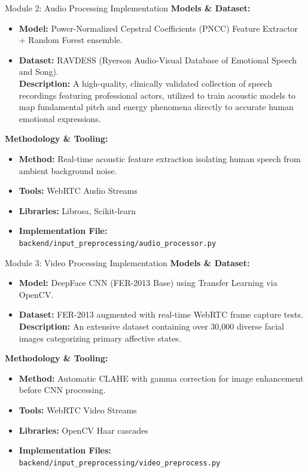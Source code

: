 \documentclass[11pt]{beamer}
\begin{document}
\begin{frame}{Module 2: Audio Processing Implementation}
    \justifying
    \textbf{Models \& Dataset:}
    \begin{itemize}
        \item \textbf{Model:} Power-Normalized Cepstral Coefficients (PNCC) Feature Extractor + Random Forest ensemble.
        \item \textbf{Dataset:} RAVDESS (Ryerson Audio-Visual Database of Emotional Speech and Song). \\ \textbf{Description:} A high-quality, clinically validated collection of speech recordings featuring professional actors, utilized to train acoustic models to map fundamental pitch and energy phenomena directly to accurate human emotional expressions.
    \end{itemize}
    \vspace{0.2cm}
    \textbf{Methodology \& Tooling:}
    \begin{itemize}
        \item \textbf{Method:} Real-time acoustic feature extraction isolating human speech from ambient background noise.
        \item \textbf{Tools:} WebRTC Audio Streams
        \item \textbf{Libraries:} Librosa, Scikit-learn
        \item \textbf{Implementation File:} \texttt{backend/input\_preprocessing/audio\_processor.py}
    \end{itemize}
\end{frame}

\begin{frame}{Module 3: Video Processing Implementation}
    \justifying
    \textbf{Models \& Dataset:}
    \begin{itemize}
        \item \textbf{Model:} DeepFace CNN (FER-2013 Base) using Transfer Learning via OpenCV.
        \item \textbf{Dataset:} FER-2013 augmented with real-time WebRTC frame capture tests. \\ \textbf{Description:} An extensive dataset containing over 30,000 diverse facial images categorizing primary affective states.
    \end{itemize}
    \vspace{0.2cm}
    \textbf{Methodology \& Tooling:}
    \begin{itemize}
        \item \textbf{Method:} Automatic CLAHE with gamma correction for image enhancement before CNN processing.
        \item \textbf{Tools:} WebRTC Video Streams
        \item \textbf{Libraries:} OpenCV Haar cascades
        \item \textbf{Implementation Files:} \texttt{backend/input\_preprocessing/video\_preprocess.py}
    \end{itemize}
\end{frame}
\end{document}
